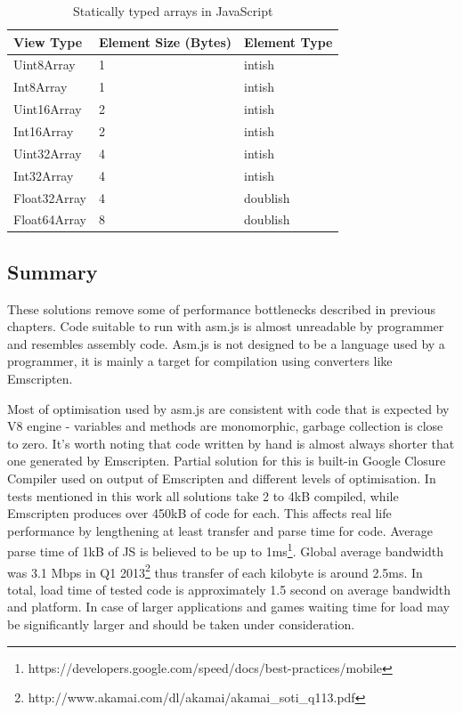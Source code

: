\begin{table}[h!]
\caption{Statically typed arrays in JavaScript}
\centering
\label{table:jsarrays}
\begin{tabular}{|l|l|l|}
  	\hline
View Type & Element Size (Bytes) & Element Type \\ \hline
Uint8Array & 1 & intish \\ \hline
Int8Array & 1 & intish \\ \hline
Uint16Array & 2 & intish \\ \hline
Int16Array & 2 & intish \\ \hline
Uint32Array & 4 & intish \\ \hline
Int32Array & 4 & intish \\ \hline
Float32Array & 4 & doublish \\ \hline
Float64Array & 8 & doublish \\ \hline
\end{tabular}
\end{table}

\subsection{Summary}
\label{sec:asmjssummary}

These solutions remove some of performance bottlenecks described in previous chapters. Code suitable to run with asm.js is almost unreadable by programmer and resembles assembly code. Asm.js is not designed to be a language used by a programmer, it is mainly a target for compilation using converters like Emscripten. 

Most of optimisation used by asm.js are consistent with code that is expected by V8 engine - variables and methods are monomorphic, garbage collection is close to zero. It's worth noting that code written by hand is almost always shorter that one generated by Emscripten. Partial solution for this is built-in Google Closure Compiler used on output of Emscripten and different levels of optimisation.
In tests mentioned in this work all solutions take 2 to 4kB compiled, while Emscripten produces over 450kB of code for each. This affects real life performance by lengthening at least transfer and parse time for code. Average parse time of 1kB of JS is believed to be up to 1ms\footnote{https://developers.google.com/speed/docs/best-practices/mobile}. Global average bandwidth was 3.1 Mbps in Q1 2013\footnote{http://www.akamai.com/dl/akamai/akamai\_soti\_q113.pdf} thus transfer of each kilobyte is around 2.5ms. In total, load time of tested code is approximately 1.5 second on average bandwidth and platform. In case of larger applications and games waiting time for load may be significantly larger and should be taken under consideration.

